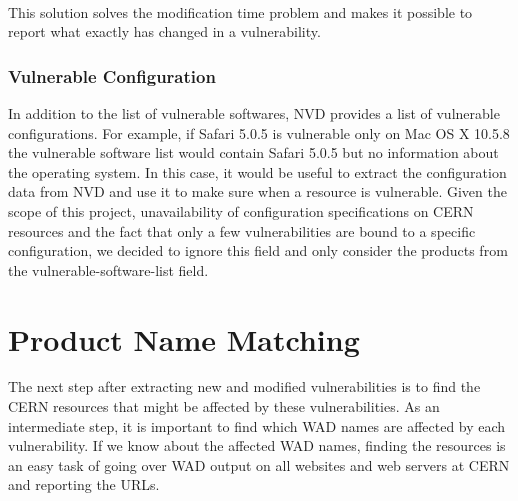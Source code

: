 \paragraph{}
This solution solves the modification time problem and makes it possible to report what exactly has changed in a vulnerability. 

\subsubsection{Vulnerable Configuration}
In addition to the list of vulnerable softwares, NVD provides a list of vulnerable configurations. For example, if Safari 5.0.5 is vulnerable only on Mac OS X 10.5.8 the vulnerable software list would contain Safari 5.0.5 but no information about the operating system. In this case, it would be useful to extract the configuration data from NVD and use it to make sure when a resource is vulnerable. Given the scope of this project, unavailability of configuration specifications on CERN resources and the fact that only a few vulnerabilities are bound to a specific configuration, we decided to ignore this field and only consider the products from the vulnerable-software-list field. 




\section{Product Name Matching}
\label{name_matching}
The next step after extracting new and modified vulnerabilities is to find the CERN resources that might be affected by these vulnerabilities. As an intermediate step, it is important to find which WAD names are affected by each vulnerability. If we know about the affected WAD names, finding the resources is an easy task of going over WAD output on all websites and web servers at CERN and reporting the URLs. 

